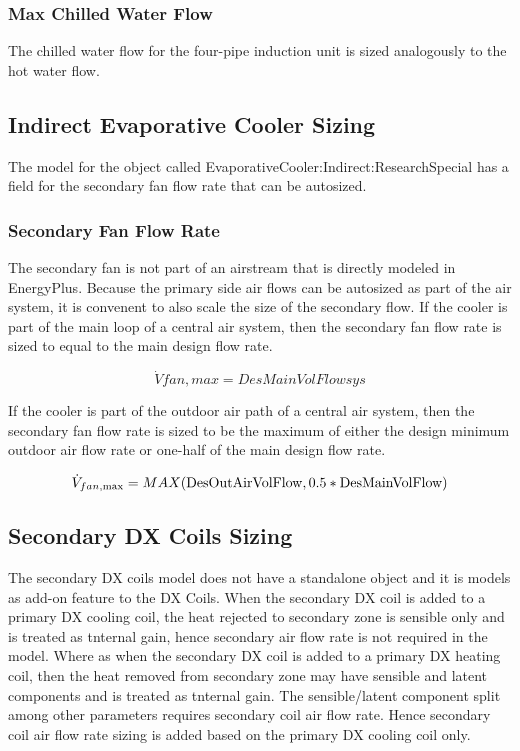 \subsubsection{Max Chilled Water Flow}\label{max-chilled-water-flow}

The chilled water flow for the four-pipe induction unit is sized analogously to the hot water flow.

\subsection{Indirect Evaporative Cooler Sizing}\label{indirect-evaporative-cooler-sizing}

The model for the object called EvaporativeCooler:Indirect:ResearchSpecial has a field for the secondary fan flow rate that can be autosized.

\subsubsection{Secondary Fan Flow Rate}\label{secondary-fan-flow-rate}

The secondary fan is not part of an airstream that is directly modeled in EnergyPlus. Because the primary side air flows can be autosized as part of the air system, it is convenent to also scale the size of the secondary flow. If the cooler is part of the main loop of a central air system, then the secondary fan flow rate is sized to equal to the main design flow rate.

\begin{equation}
\dot Vfan,max = DesMainVolFlowsys
\end{equation}

If the cooler is part of the outdoor air path of a central air system, then the secondary fan flow rate is sized to be the maximum of either the design minimum outdoor air flow rate or one-half of the main design flow rate.

\begin{equation}
{\dot V_{fan,\max }} = MAX({\rm{DesOutAirVolFlow, 0}}{\rm{.5*DesMainVolFlow)}}
\end{equation}

\subsection{Secondary DX Coils Sizing}\label{secondary-dx-coils-sizing}

The secondary DX coils model does not have a standalone object and it is models as add-on feature to the DX Coils. When the secondary DX coil is added to a primary DX cooling coil, the heat rejected to secondary zone is sensible only and is treated as tnternal gain, hence secondary air flow rate is not required in the model. Where as when the secondary DX coil is added to a primary DX heating coil, then the heat removed from secondary zone may have sensible and latent components and is treated as tnternal gain. The sensible/latent component split among other parameters requires secondary coil air flow rate. Hence secondary coil air flow rate sizing is added based on the primary DX cooling coil only.

